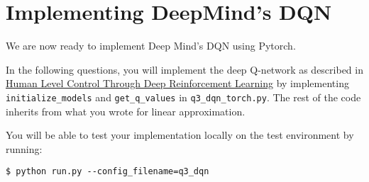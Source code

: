 \section{Implementing DeepMind's DQN}

We are now ready to implement Deep Mind's DQN using Pytorch.

In the following questions, you will implement the deep Q-network as described in \href{https://storage.googleapis.com/deepmind-media/dqn/DQNNaturePaper.pdf}{Human Level Control Through Deep Reinforcement Learning} by implementing \texttt{initialize\_models} and \texttt{get\_q\_values} in \texttt{q3\_dqn\_torch.py}. The rest of the code inherits from what you wrote for linear approximation. 

You will be able to test your implementation locally on the test environment by running:

\begin{lstlisting}
$ python run.py --config_filename=q3_dqn
\end{lstlisting} 

\begin{enumerate}[(a)]

	

	

	

\end{enumerate}